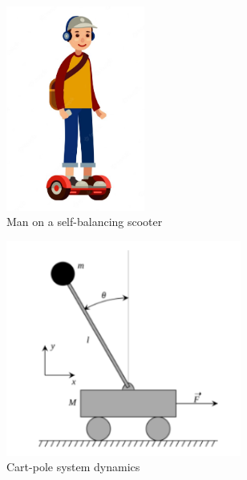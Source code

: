 \documentclass[10pt,a4paper]{article}
\begin{document}
	\begin{figure}[H]
		\centering
		\begin{subfigure}[b]{0.3\textwidth}
			\centering
			\includegraphics[width=0.5\textwidth]{figure/scooter}
			\caption{Man on a self-balancing scooter}
			\label{fig:scooter}
		\end{subfigure}
		\hfill
		\begin{subfigure}[b]{0.3\textwidth}
			\centering
			\includegraphics[width=0.85\textwidth]{figure/cart-pole}
			\caption{Cart-pole system dynamics}
			\label{fig:cart-pole}
		\end{subfigure}
		\hfill
		\begin{subfigure}[b]{0.3\textwidth}

\end{subfigure}
\end{figure}
\end{document}
